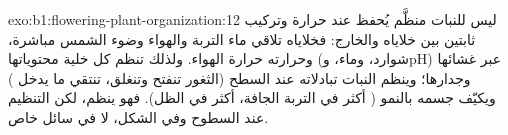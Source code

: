 \begin{solution}{exo:b1:flowering-plant-organization:12}
ليس للنبات  منظَّم يُحفظ عند حرارة وتركيب ثابتين بين
خلاياه والخارج: فخلاياه تلاقي ماء التربة والهواء وضوء الشمس مباشرة،
وحرارته حرارة الهواء. ولذلك تنظم كل خلية محتوياتها (شوارد، وماء،
وpH) عبر غشائها وجدارها؛ وينظم النبات تبادلاته عند السطح (الثغور
تنفتح وتنغلق،  تنتقي ما يدخل ) ويكيّف جسمه
بالنمو ( أكثر في التربة الجافة،  أكثر في الظل). فهو ينظم،
لكن التنظيم عند السطوح وفي الشكل، لا في سائل خاص.
\end{solution}

